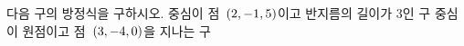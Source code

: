 다음 구의 방정식을 구하시오.
 중심이 점~$(2{,}\mkern3mu\mathopen{}-1{,}\mkern3mu\mathopen{}5)$이고 반지름의 길이가 $3$인 구
 중심이 원점이고 점~$(3{,}\mkern3mu\mathopen{}-4{,}\mkern3mu\mathopen{}0)$을 지나는 구
